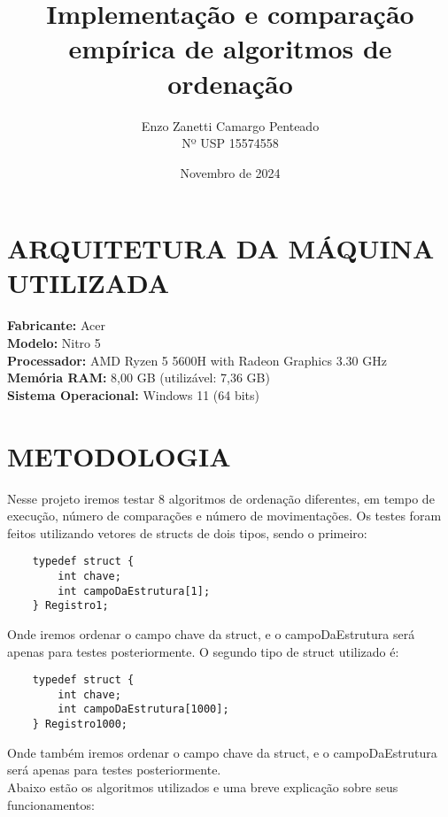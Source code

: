 \documentclass[a4paper, 12pt]{article}
\title{Implementação e comparação empírica de algoritmos de ordenação}
\author{Enzo Zanetti Camargo Penteado \\ Nº USP 15574558}
\date{Novembro de 2024}
\begin{document}
\maketitle

\section{ARQUITETURA DA MÁQUINA UTILIZADA}
\textbf{Fabricante: } Acer \\
\textbf{Modelo: } Nitro 5 \\
\textbf{Processador: } AMD Ryzen 5 5600H with Radeon Graphics 3.30 GHz \\
\textbf{Memória RAM: } 8,00 GB (utilizável: 7,36 GB) \\
\textbf{Sistema Operacional: } Windows 11 (64 bits)
\section{METODOLOGIA}
Nesse projeto iremos testar 8 algoritmos de ordenação diferentes, em tempo de execução, número de comparações e número de movimentações. Os testes foram feitos utilizando vetores de structs de dois tipos, sendo o primeiro:
\begin{verbatim}
    typedef struct {
        int chave;
        int campoDaEstrutura[1];
    } Registro1;
\end{verbatim}
Onde iremos ordenar o campo chave da struct, e o campoDaEstrutura será apenas para testes posteriormente. O segundo tipo de struct utilizado é:
\begin{verbatim}
    typedef struct {
        int chave;
        int campoDaEstrutura[1000];
    } Registro1000;
\end{verbatim}
Onde também iremos ordenar o campo chave da struct, e o campoDaEstrutura será apenas para testes posteriormente. \\
Abaixo estão os algoritmos utilizados e uma breve explicação sobre seus funcionamentos:
\end{document}
